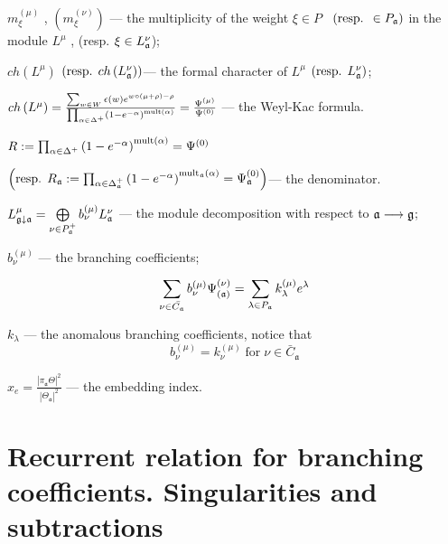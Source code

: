 \documentclass[a4paper,12pt]{article}
\theoremstyle{definition} \newtheorem{Def}{Definition}
\begin{document}
$m_{\xi }^{\left( \mu \right) }$ , $\left( m_{\xi }^{\left( \nu \right)
}\right) $ --- the multiplicity of the weight $\xi \in P$ \ $\left( \text{%
resp. }\in P_{\frak{a}}\right) $ in the module $L^{\mu }$ , (resp. $\xi \in
L_{\frak{a}}^{\nu } $);

$ch\left( L^{\mu }\right) $ $\left( \text{resp. }ch\left( L_{\frak{a}}^{\nu
}\right) \right) $--- the formal character of $L^{\mu }$ $\left( \text{resp. }%
L_{\frak{a}}^{\nu }\right) $;

$ch\left( L^{\mu }\right) =\frac{\sum_{w\in W}\epsilon (w)e^{w\circ (\mu
+\rho )-\rho }}{\prod_{\alpha \in \Delta ^{+}}\left( 1-e^{-\alpha }\right) ^{%
\mathrm{{mult}\left( \alpha \right) }}}=\frac{\Psi ^{\left( \mu \right) }}{%
\Psi ^{\left( 0\right) }}$ --- the Weyl-Kac formula.

$R:=\prod_{\alpha \in \Delta ^{+}}\left( 1-e^{-\alpha }\right) ^{\mathrm{{%
mult}\left( \alpha \right) }}=\Psi ^{\left( 0\right) }\quad $

\noindent $\left( \text{resp. }R_{\frak{a}}:=\prod_{\alpha \in \Delta _{%
\frak{a}}^{+}}\left( 1-e^{-\alpha }\right) ^{\mathrm{mult}_{\frak{a}}\mathrm{%
\left( \alpha \right) }}=\Psi _{\frak{a}}^{\left( 0\right) }\right) $--- the
denominator.

$  L_{\frak{g}\downarrow \frak{a}}^{\mu }=\bigoplus\limits_{\nu \in P_{\frak{a}}^{+}}b_{\nu }^{\left( \mu \right) }L_{\frak{a}}^{\nu }$ --- the module decomposition with respect to $\frak{a}\longrightarrow \frak{g}$;


$b^{(\mu)}_{\nu}$ --- the branching coefficients;

\begin{equation}
  \label{eq:21}
  \sum_{\nu \in \bar{C_{\mathfrak{a}}}}b_{\nu }^{\left( \mu \right) }\Psi _{\left( \frak{%
        a}\right) }^{\left( \nu \right) }=\sum_{\lambda \in P_{\frak{a}}}k_{\lambda
  }^{\left( \mu \right) }e^{\lambda }
\end{equation}

 $k_{\lambda}$ --- the anomalous branching coefficients, notice that
\begin{equation}
  \label{eq:20}
  b^{(\mu)}_{\nu}=k^{(\mu)}_{\nu} \; \mbox{for} \; \nu\in \bar{C}_{\mathfrak{a}}
\end{equation}

$x_e=\frac{\left|\pi_{\mathfrak{a}} \Theta\right|^2}{\left|\Theta_{\mathfrak{a}}\right|^2}$ --- the embedding index.

\section{Recurrent relation for branching coefficients. Singularities and subtractions}
\label{sec:recurr-form-branch}
\end{document}
